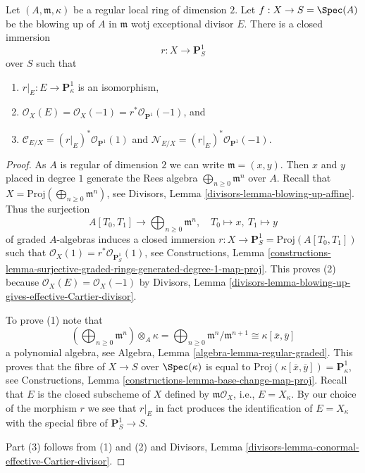 \begin{lemma}
\label{lemma-blowup}
Let $(A, \mathfrak m, \kappa)$ be a regular local ring of dimension $2$.
Let $f : X \to S = \Spec(A)$ be the blowing up of $A$ in $\mathfrak m$
wotj exceptional divisor $E$. There is a closed immersion
$$
r : X \longrightarrow \mathbf{P}^1_S
$$
over $S$ such that
\begin{enumerate}
\item $r|_E : E \to \mathbf{P}^1_\kappa$ is an isomorphism,
\item $\mathcal{O}_X(E) = \mathcal{O}_X(-1) =
r^*\mathcal{O}_{\mathbf{P}^1}(-1)$, and
\item $\mathcal{C}_{E/X} = (r|_E)^*\mathcal{O}_{\mathbf{P}^1}(1)$ and
$\mathcal{N}_{E/X} = (r|_E)^*\mathcal{O}_{\mathbf{P}^1}(-1)$.
\end{enumerate}
\end{lemma}

\begin{proof}
As $A$ is regular of dimension $2$ we can write $\mathfrak m = (x, y)$.
Then $x$ and $y$ placed in degree $1$ generate the Rees algebra
$\bigoplus_{n \geq 0} \mathfrak m^n$ over $A$. Recall that
$X = \text{Proj}(\bigoplus_{n \geq 0} \mathfrak m^n)$, see
Divisors, Lemma \ref{divisors-lemma-blowing-up-affine}.
Thus the surjection
$$
A[T_0, T_1] \longrightarrow \bigoplus\nolimits_{n \geq 0} \mathfrak m^n,
\quad
T_0 \mapsto x,\ T_1 \mapsto y
$$
of graded $A$-algebras induces a closed immersion
$r : X \to \mathbf{P}^1_S = \text{Proj}(A[T_0, T_1])$
such that $\mathcal{O}_X(1) = r^*\mathcal{O}_{\mathbf{P}^1_S}(1)$, see
Constructions, Lemma
\ref{constructions-lemma-surjective-graded-rings-generated-degree-1-map-proj}.
This proves (2) because $\mathcal{O}_X(E) = \mathcal{O}_X(-1)$
by Divisors, Lemma
\ref{divisors-lemma-blowing-up-gives-effective-Cartier-divisor}.

\medskip\noindent
To prove (1) note that
$$
\left(\bigoplus\nolimits_{n \geq 0} \mathfrak m^n\right) \otimes_A \kappa =
\bigoplus\nolimits_{n \geq 0} \mathfrak m^n/\mathfrak m^{n + 1} \cong
\kappa[\overline{x}, \overline{y}]
$$
a polynomial algebra, see Algebra, Lemma \ref{algebra-lemma-regular-graded}.
This proves that the fibre of $X \to S$ over $\Spec(\kappa)$ is equal to
$\text{Proj}(\kappa[\overline{x}, \overline{y}]) = \mathbf{P}^1_\kappa$, see
Constructions, Lemma \ref{constructions-lemma-base-change-map-proj}.
Recall that $E$ is the closed subscheme of $X$ defined by
$\mathfrak m\mathcal{O}_X$, i.e., $E = X_\kappa$.
By our choice of the morphism $r$ we see that $r|_E$ in fact
produces the identification of $E = X_\kappa$ with the special
fibre of $\mathbf{P}^1_S \to S$.

\medskip\noindent
Part (3) follows from (1) and (2) and Divisors, Lemma
\ref{divisors-lemma-conormal-effective-Cartier-divisor}.
\end{proof}

